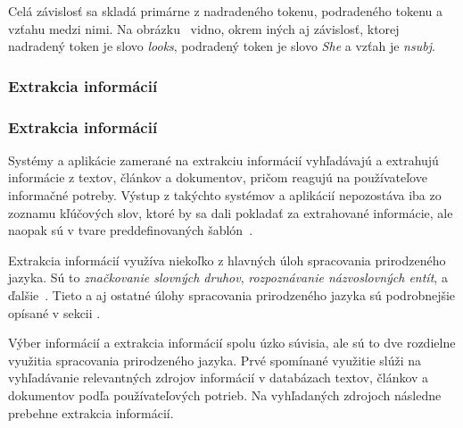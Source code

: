 Celá závislosť sa skladá primárne z nadradeného tokenu, podradeného tokenu a vzťahu medzi nimi. Na obrázku~ vidno, okrem iných aj závislosť, ktorej nadradený token je slovo \textit{looks}, podradený token je slovo \textit{She} a vzťah je \textit{nsubj}.

%
%
{
	\subsubsection{Extrakcia informácií}
}
{
	\subsubsection{Extrakcia informácií}
}
\label{subsubsec:information_extraction}
Systémy a aplikácie zamerané na extrakciu informácií vyhľadávajú a extrahujú informácie z textov, článkov a dokumentov, pričom reagujú na používateľove informačné potreby. Výstup z takýchto systémov a aplikácií nepozostáva iba zo zoznamu kľúčových slov, ktoré by sa dali pokladať za extrahované informácie, ale naopak sú v tvare preddefinovaných šablón~\cite{Preeti}.

Extrakcia informácií využíva niekoľko z hlavných úloh spracovania prirodzeného jazyka. Sú to \textit{značkovanie slovných druhov}, \textit{rozpoznávanie názvoslovných entít}, a ďalšie~\cite{Preeti}. Tieto a aj ostatné úlohy spracovania prirodzeného jazyka sú podrobnejšie opísané v sekcii .

Výber informácií a extrakcia informácií spolu úzko súvisia, ale sú to dve rozdielne využitia spracovania prirodzeného jazyka. Prvé spomínané využitie slúži na vyhľadávanie relevantných zdrojov informácií v databázach textov, článkov a dokumentov podľa používateľových potrieb. Na vyhľadaných zdrojoch následne prebehne extrakcia informácií. 


